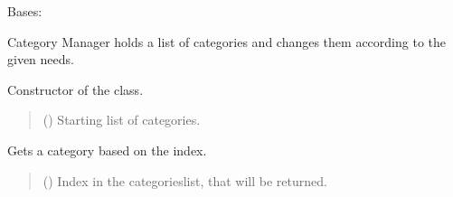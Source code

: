 \documentclass[letterpaper,10pt,english]{sphinxmanual}
\begin{document}
\begin{fulllineitems}
\label{\detokenize{apidoc/src.osm_configurator.model.project.configuration:src.osm_configurator.model.project.configuration.category_manager.CategoryManager}}
\pysigstartsignatures
{}
\pysigstopsignatures
\sphinxAtStartPar
Bases: 

\sphinxAtStartPar
Category Manager holds a list of categories and changes them according to the given needs.

\begin{fulllineitems}
\label{\detokenize{apidoc/src.osm_configurator.model.project.configuration:src.osm_configurator.model.project.configuration.category_manager.CategoryManager.__init__}}
\pysigstartsignatures
{}
\pysigstopsignatures
\sphinxAtStartPar
Constructor of the class.
\begin{quote}\begin{description}
\sphinxAtStartPar
{} ({\hyperref[\detokenize{apidoc/src.osm_configurator.model.project.configuration:src.osm_configurator.model.project.configuration.category.Category}]{}}) \textendash{} Starting list of categories.

\end{description}\end{quote}

\end{fulllineitems}


\begin{fulllineitems}
\label{\detokenize{apidoc/src.osm_configurator.model.project.configuration:src.osm_configurator.model.project.configuration.category_manager.CategoryManager.get_category}}
\pysigstartsignatures
{}
\pysigstopsignatures
\sphinxAtStartPar
Gets a category based on the index.
\begin{quote}\begin{description}
\sphinxAtStartPar
{} () \textendash{} Index in the categories\sphinxhyphen{}list, that will be returned.


\end{description}
\end{quote}
\end{fulllineitems}
\end{fulllineitems}
\end{document}
